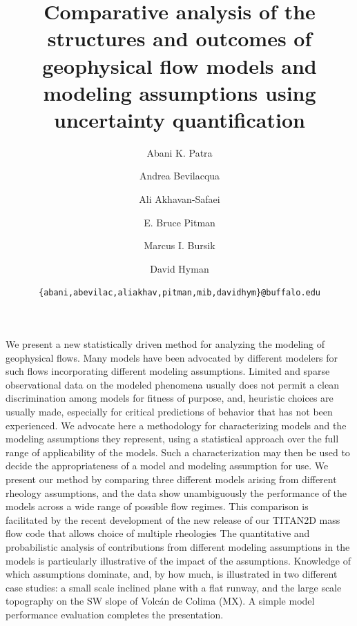 \documentclass{article}
\begin{document}
\title{\bf Comparative analysis of the structures and outcomes of geophysical flow models and modeling assumptions using uncertainty quantification}
\author[1,3]{Abani K. Patra}
\author[2]{Andrea Bevilacqua}
\author[1]{Ali Akhavan-Safaei}
\author[4]{E. Bruce Pitman}
\author[2]{Marcus I. Bursik}
\author[2]{David Hyman}


\date{\texttt{\{abani,abevilac,aliakhav,pitman,mib,davidhym\}@buffalo.edu}}


\maketitle

\abstract

We present a new statistically driven method for analyzing the modeling of geophysical flows. Many models have been advocated by different modelers for such flows incorporating different modeling assumptions. Limited and sparse observational data on the modeled phenomena usually does not permit a clean discrimination among models for fitness of purpose, and, heuristic choices are usually made, especially for critical predictions of behavior that has not been experienced. We advocate here a methodology for characterizing models and the modeling assumptions they represent, using a statistical approach over the full range of applicability of the models. Such a characterization may then be used to decide the appropriateness of a model and modeling assumption for use.%
We present our method by comparing three different models arising from different rheology assumptions, and the data show unambiguously the performance of the models across a wide range of possible flow regimes. This comparison is facilitated by the recent development of the new release of our TITAN2D mass flow code that allows choice of multiple rheologies The quantitative and probabilistic analysis of contributions from different modeling  assumptions in the models is particularly illustrative of the impact of the assumptions. Knowledge of which assumptions dominate, and, by how much, is illustrated in two different case studies: a small scale inclined plane with a flat runway, and the large scale topography on the SW slope of Volc\'{a}n de Colima (MX). A simple model performance evaluation completes the presentation.
\end{document}
